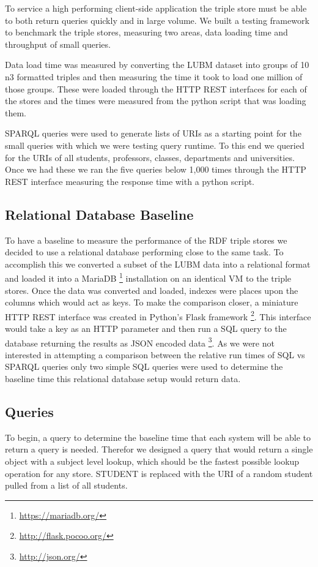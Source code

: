 \documentclass{llncs}
\begin{document}
To service a high performing client-side application the triple store must be able to both return queries quickly and in large volume.  We built a testing framework to benchmark the triple stores, measuring two areas, data loading time and throughput of small queries.

Data load time was measured by converting the LUBM dataset into groups of 10 n3 formatted triples and then measuring the time it took to load one million of those groups.  These were loaded through the HTTP REST interfaces for each of the stores and the times were measured from the python script that was loading them.

SPARQL queries were used to generate lists of URIs as a starting point for the small queries with which we were testing query runtime.  To this end we queried for the URIs of all students, professors, classes, departments and universities.  Once we had these we ran the five queries below 1,000 times through the HTTP REST interface measuring the response time with a python script.

\subsection{Relational Database Baseline}
To have a baseline to measure the performance of the RDF triple stores we decided to use a relational database performing close to the same task.  To accomplish this we converted a subset of the LUBM data into a relational format and loaded it into a MariaDB \footnote{\url{https://mariadb.org/}} installation on an identical VM to the triple stores. Once the data was converted and loaded, indexes were places upon the columns which would act as keys. To make the comparison closer, a miniature HTTP REST interface was created in Python's Flask framework \footnote{\url{http://flask.pocoo.org/}}. This interface would take a key as an HTTP parameter and then run a SQL query to the database returning the results as JSON encoded data \footnote{\url{http://json.org/}}. As we were not interested in attempting a comparison between the relative run times of SQL vs SPARQL queries only two simple SQL queries were used to determine the baseline time this relational database setup would return data.

\subsection{Queries}
To begin, a query to determine the baseline time that each system will be able to return a query is needed.  Therefor we designed a query that would return a single object with a subject level lookup, which should be the fastest possible lookup operation for any store.  STUDENT is replaced with the URI of a random student pulled from a list of all students.
\end{document}
